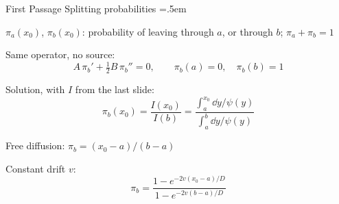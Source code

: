 \documentclass[xcolor={dvipsnames},t]{beamer}
\let\olditemize=\itemize
\let\endolditemize=\enditemize
\renewenvironment{itemize}{\olditemize \itemsep=.5em }{\endolditemize}
\begin{document}
\begin{frame}{First Passage}
    \alert{Splitting probabilities}
    \begin{itemize}
        \item<2-> $\pi_a(x_0)$, $\pi_b(x_0)$: probability of leaving through $a$, or through $b$; $\pi_a+\pi_b=1$
        \item<3-> Same operator, no source:
        \[ A\,\pi_b' + \tfrac12B\,\pi_b'' = 0,\qquad \pi_b(a)=0,\quad \pi_b(b)=1 \]
        \vspace{-1.5em}
        \item<4-> Solution, with $I$ from the last slide:
        \[ \pi_b(x_0) = \frac{I(x_0)}{I(b)} = \frac{\int_a^{x_0}\dd y/\psi(y)}{\int_a^b\dd y/\psi(y)} \]
        \vspace{-1em}
        \item<5-> Free diffusion: $\pi_b=(x_0-a)/(b-a)$
        \item<6-> Constant drift $v$:
        \[ \pi_b=\frac{1-e^{-2v(x_0-a)/D}}{1-e^{-2v(b-a)/D}} \]
    \end{itemize}
\end{frame}
\end{document}
